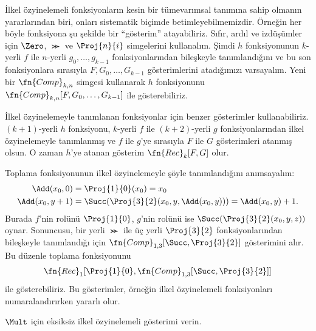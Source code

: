 \documentclass[../../../include/open-logic-section]{subfiles}
\begin{document}

İlkel özyinelemeli fonksiyonların kesin bir tümevarımsal tanımına sahip
olmanın yararlarından biri, onları sistematik biçimde betimleyebilmemizdir.
Örneğin her böyle fonksiyona şu şekilde bir ``gösterim'' atayabiliriz. Sıfır,
ardıl ve izdüşümler için $\Zero$, $\Succ$ ve $\Proj{n}{i}$ simgelerini
kullanalım. Şimdi $h$ fonksiyonunun $k$-yerli $f$ ile $n$-yerli
$g_0,\dots,g_{k-1}$ fonksiyonlarından bileşkeyle tanımlandığını ve bu son
fonksiyonlara sırasıyla $F,G_0,\dots,G_{k-1}$ gösterimlerini atadığımızı
varsayalım. Yeni bir $\fn{Comp}_{k,n}$ simgesi kullanarak $h$ fonksiyonunu
$\fn{Comp}_{k,n}[F,G_0,\dots,G_{k-1}]$ ile gösterebiliriz.

İlkel özyinelemeyle tanımlanan fonksiyonlar için benzer gösterimler
kullanabiliriz. $(k+1)$-yerli $h$ fonksiyonu, $k$-yerli $f$ ile
$(k+2)$-yerli $g$ fonksiyonlarından ilkel özyinelemeyle tanımlanmış ve
$f$ ile $g$'ye sırasıyla $F$ ile $G$ gösterimleri atanmış olsun. O zaman
$h$'ye atanan gösterim $\fn{Rec}_k[F,G]$ olur.

Toplama fonksiyonunun ilkel özyinelemeyle şöyle tanımlandığını anımsayalım:
\begin{align*}
  \Add(x_0,0) & = \Proj{1}{0}(x_0)=x_0 \\
  \Add(x_0,y+1) & = \Succ(\Proj{3}{2}(x_0,y,\Add(x_0,y)))
    =\Add(x_0,y)+1.
\end{align*}
Burada $f$'nin rolünü $\Proj{1}{0}$, $g$'nin rolünü ise
$\Succ(\Proj{3}{2}(x_0,y,z))$ oynar. Sonuncusu, bir yerli $\Succ$ ile üç
yerli $\Proj{3}{2}$ fonksiyonlarından bileşkeyle tanımlandığı için
$\fn{Comp}_{1,3}[\Succ,\Proj{3}{2}]$ gösterimini alır. Bu düzenle toplama
fonksiyonunu
\[
  \fn{Rec}_1[\Proj{1}{0},\fn{Comp}_{1,3}[\Succ,\Proj{3}{2}]]
\]
ile gösterebiliriz. Bu gösterimler, örneğin ilkel özyinelemeli fonksiyonları
numaralandırırken yararlı olur.

\begin{prob}
  $\Mult$ için eksiksiz ilkel özyinelemeli gösterimi verin.
\end{prob}
\end{document}
